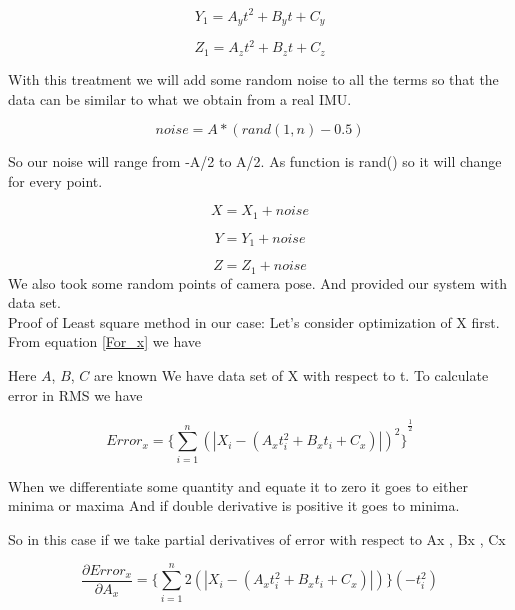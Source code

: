 \begin{equation}
Y_1=A_y t^2+B_y t +C_y
\end{equation}

\begin{equation}
Z_1=A_z t^2+B_z t +C_z
\end{equation}

With this treatment we will add some random noise to all the terms so that the data can be similar to what we obtain from a real IMU.

\begin{equation}
noise=A*(rand(1,n)-0.5)
\end{equation}

So our noise will range from -A/2 to A/2.
As function is rand() so it will change for every point.

\begin{equation}
X=X_1+noise
\end{equation}

\begin{equation}
Y=Y_1+noise
\end{equation}

\begin{equation}
Z=Z_1+noise
\end{equation}
We also took some random points of camera pose. And provided our system with data set.\\

Proof of Least square method in our case:
Let’s consider optimization of X first. From equation \eqref{For_x} we have

Here $A$, $B$, $C$ are known
We have data set of X with respect to t.
To calculate error in RMS we have
 
\begin{equation} 
 Error_x={\lbrace\displaystyle\sum_{i=1}^{n}(|X_i-(A_xt_i^2+B_x t_i +C_x)|)^2\rbrace}^\frac{1}{2} 
\end{equation}


When we differentiate some quantity and equate it to zero it goes to either minima or maxima
And if double derivative is positive it goes to minima.

So in this case if we take partial derivatives of error with respect to Ax , Bx , Cx

\begin{equation} 
 \frac{\partial Error_x}{\partial A_x} = {\lbrace\displaystyle\sum_{i=1}^{n}2(|X_i-(A_xt_i^2+B_x t_i +C_x)|)\rbrace}({-t_i^2})
\end{equation}

